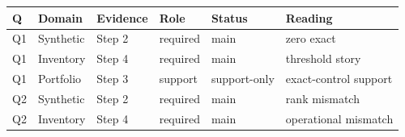 \begin{tabular}{llllll}
\toprule
Q & Domain & Evidence & Role & Status & Reading \\
\midrule
Q1 & Synthetic & Step 2 & required & main & zero exact \\
Q1 & Inventory & Step 4 & required & main & threshold story \\
Q1 & Portfolio & Step 3 & support & support-only & exact-control support \\
Q2 & Synthetic & Step 2 & required & main & rank mismatch \\
Q2 & Inventory & Step 4 & required & main & operational mismatch \\
\bottomrule
\end{tabular}
